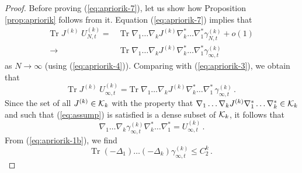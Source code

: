 \documentclass[11pt]{article}
\newcommand{\tr}{\mbox{Tr}}
\newcommand{\cK}{{\cal K}}
\begin{document}
\begin{proof}
Before proving (\ref{eq:apriorik-7}), let us show how Proposition
\ref{prop:apriorik} follows from it. Equation (\ref{eq:apriorik-7})
implies that
\begin{equation}
\begin{split}
\tr \; J^{(k)} \; U_{N,t}^{(k)} = \; & \tr \; \nabla_1 \dots
\nabla_k J^{(k)} \nabla^*_k \dots \nabla^*_1  \gamma_{N,t}^{(k)} + o(1) \\
\to \; & \tr \; \nabla_1 \dots \nabla_k J^{(k)} \nabla^*_k \dots
\nabla^*_1  \gamma_{\infty,t}^{(k)}
\end{split}
\end{equation}
as $N \to \infty$ (using (\ref{eq:apriorik-4})). Comparing with
(\ref{eq:apriorik-3}), we obtain that
\begin{equation}
\tr \; J^{(k)} \; U^{(k)}_{\infty,t} = \tr \; \nabla_1 \dots
\nabla_k J^{(k)} \nabla^*_k \dots \nabla^*_1 \,
\gamma_{\infty,t}^{(k)} \, .
\end{equation}
Since the set of all
 $J^{(k)} \in \cK_k$ with the property that $\nabla_1 \dots
\nabla_k J^{(k)} \nabla^*_1 \dots \nabla^*_k \in \cK_k$ and
such that (\ref{eq:assump}) is satisfied is a dense subset of
$\cK_k$, it follows that
\begin{equation}
\nabla_1 \dots \nabla_k  \gamma_{\infty,t}^{(k)} \nabla^*_k \dots
\nabla^*_1 = U^{(k)}_{\infty,t}\,.
\end{equation}
{F}rom (\ref{eq:apriorik-1b}), we find
\begin{equation}\label{eq:apriorik-8}
\tr \; (-\Delta_1) \dots (-\Delta_k)  \gamma^{(k)}_{\infty,t} \leq
C_2^k \,.
\end{equation}


\end{proof}
\end{document}

